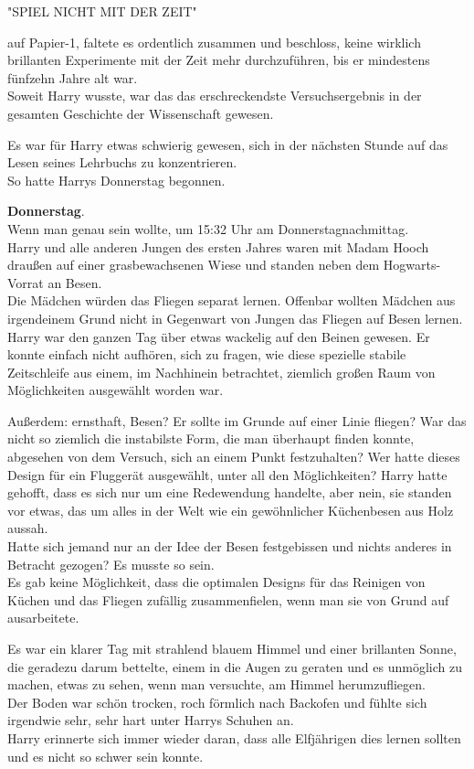 {"SPIEL NICHT MIT DER ZEIT"

auf Papier-1, faltete es ordentlich zusammen und beschloss, keine wirklich brillanten Experimente mit der Zeit mehr durchzuführen, bis er mindestens fünfzehn Jahre alt war.\\ Soweit Harry wusste, war das das erschreckendste Versuchsergebnis in der gesamten Geschichte der Wissenschaft gewesen.

Es war für Harry etwas schwierig gewesen, sich in der nächsten Stunde auf das Lesen seines Lehrbuchs zu konzentrieren.\\ So hatte Harrys Donnerstag begonnen.

\textbf{Donnerstag}.\\ Wenn man genau sein wollte, um 15:32 Uhr am Donnerstagnachmittag.\\ Harry und alle anderen Jungen des ersten Jahres waren mit Madam Hooch draußen auf einer grasbewachsenen Wiese und standen neben dem Hogwarts-Vorrat an Besen.\\ Die Mädchen würden das Fliegen separat lernen. Offenbar wollten Mädchen aus irgendeinem Grund nicht in Gegenwart von Jungen das Fliegen auf Besen lernen.\\ Harry war den ganzen Tag über etwas wackelig auf den Beinen gewesen. Er konnte einfach nicht aufhören, sich zu fragen, wie diese spezielle stabile Zeitschleife aus einem, im Nachhinein betrachtet, ziemlich großen Raum von Möglichkeiten ausgewählt worden war.

Außerdem: ernsthaft, Besen? Er sollte im Grunde auf einer Linie fliegen? War das nicht so ziemlich die instabilste Form, die man überhaupt finden konnte, abgesehen von dem Versuch, sich an einem Punkt festzuhalten? Wer hatte dieses Design für ein Fluggerät ausgewählt, unter all den Möglichkeiten? Harry hatte gehofft, dass es sich nur um eine Redewendung handelte, aber nein, sie standen vor etwas, das um alles in der Welt wie ein gewöhnlicher Küchenbesen aus Holz aussah.\\ Hatte sich jemand nur an der Idee der Besen festgebissen und nichts anderes in Betracht gezogen? Es musste so sein.\\ Es gab keine Möglichkeit, dass die optimalen Designs für das Reinigen von Küchen und das Fliegen zufällig zusammenfielen, wenn man sie von Grund auf ausarbeitete.

Es war ein klarer Tag mit strahlend blauem Himmel und einer brillanten Sonne, die geradezu darum bettelte, einem in die Augen zu geraten und es unmöglich zu machen, etwas zu sehen, wenn man versuchte, am Himmel herumzufliegen.\\ Der Boden war schön trocken, roch förmlich nach Backofen und fühlte sich irgendwie sehr, sehr hart unter Harrys Schuhen an.\\ Harry erinnerte sich immer wieder daran, dass alle Elfjährigen dies lernen sollten und es nicht so schwer sein konnte.

}
